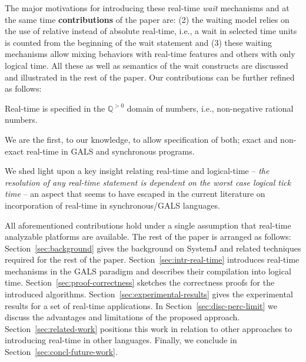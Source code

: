 

The major motivations for introducing these real-time \textit{wait}
mechanisms and at the same time \textbf{contributions} of the paper are:
 (2) the waiting
model relies on the use of relative instead of absolute real-time, i.e.,
a wait in selected time units is counted from the beginning of the wait
statement and (3) these waiting mechanisms allow mixing behaviors with
real-time features and others with only logical time. All these as well
as semantics of the wait constructs are discussed and illustrated in the
rest of the paper. Our contributions can be further refined as follows:

\begin{enumerate*}
\item Real-time is specified in the $\mathbb{Q}^{>0}$ domain of numbers,
  i.e., non-negative rational numbers.
\item We are the first, to our knowledge, to allow specification of
  both; exact and non-exact real-time in GALS and synchronous programs.
\item We shed light upon a key insight relating real-time and
  logical-time -- \textit{the resolution of any real-time statement is
    dependent on the worst case logical tick time} -- an aspect that
  seems to have escaped in the current literature on incorporation of
  real-time in synchronous/GALS languages.
\end{enumerate*}

All aforementioned contributions hold under a single assumption that
real-time analyzable platforms are available. The rest of the paper is
arranged as follows: Section~\ref{sec:background} gives the background
on SystemJ and related techniques required for the rest of the paper.
Section~\ref{sec:intr-real-time} introduces real-time mechanisms in the
GALS paradigm and describes their compilation into logical time.
Section~\ref{sec:proof-correctness} sketches the correctness proofs for
the introduced algorithms. Section~\ref{sec:experimental-results} gives
the experimental results for a set of real-time applications. In
Section~\ref{sec:disc-perc-limit} we discuss the advantages and
limitations of the proposed approach. Section~\ref{sec:related-work}
positions this work in relation to other approaches to introducing
real-time in other languages. Finally, we conclude in
Section~\ref{sec:concl-future-work}.


